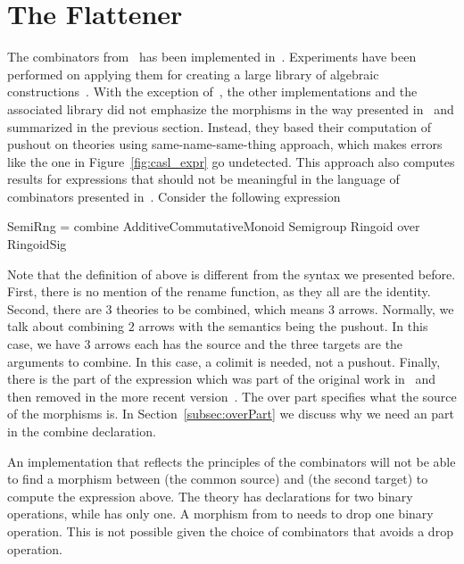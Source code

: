 \section{The Flattener}
\label{sec:lib_implementation}
The combinators from~\cite{carette2018building} has been implemented in~\cite{cicm2019diagrams, TPCProto, meta-prim-blog}. 
Experiments have been performed on applying them for creating a large library of algebraic constructions~\cite{mathscheme2011experiments}. With the exception of~\cite{cicm2019diagrams}, the other implementations and the associated library did not emphasize the morphisms in the way presented in~\cite{carette2018building} and summarized in the previous section. Instead, they based their computation of pushout on theories using same-name-same-thing approach, which makes errors like the one in Figure~\ref{fig:casl_expr} go undetected.  
This approach also computes results for expressions that should not be meaningful in the language of combinators presented in~\cite{carette2018building}. Consider the following expression
\begin{togcode}
SemiRng = combine AdditiveCommutativeMonoid Semigroup Ringoid
          over RingoidSig
\end{togcode}
Note that the definition of  above is different from the syntax we presented before. First, there is no mention of the rename function, as they all are the identity. Second, there are $3$ theories to be combined, which means $3$ arrows. Normally, we talk about combining $2$ arrows with the semantics being the pushout. In this case, we have $3$ arrows each has the source  and the three targets are the arguments to combine. In this case, a colimit is needed, not a pushout. Finally, there is the  part of the expression which was part of the original work in~\cite{CaretteOConnorTPC} and then removed in the more recent version~\cite{carette2018building}. The over part specifies what the source of the morphisms is. In Section~\ref{subsec:overPart} we discuss why we need an  part in the combine declaration. 

An implementation that reflects the principles of the combinators will not be able to find a morphism between  (the common source) and  (the second target) to compute the expression above. 
The theory  has declarations for two binary operations, while  has only one. A morphism from  to  needs to drop one binary operation. This is not possible given the choice of combinators that avoids a drop operation. 


